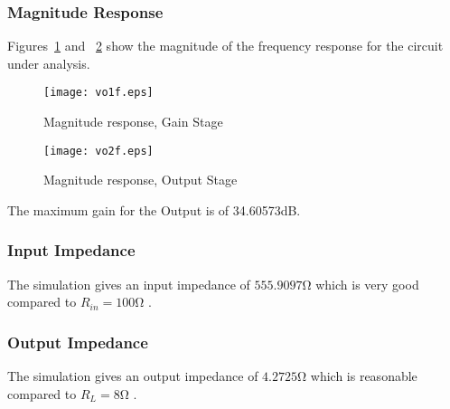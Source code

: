 \subsubsection{Magnitude Response}

Figures~\ref{fig:MRGS} and ~\ref{fig:MROS} show the magnitude of the frequency response for the
circuit under analysis.

\begin{figure}[h] \centering
\texttt{[image: vo1f.eps]}
\caption{Magnitude response, Gain Stage}
\label{fig:MRGS}
\end{figure}

\begin{figure}[h] \centering
\texttt{[image: vo2f.eps]}
\caption{Magnitude response, Output Stage}
\label{fig:MROS}
\end{figure}
\vspace{30mm}

The maximum gain for the Output is of 34.60573dB.

\subsubsection{Input Impedance}
The simulation gives an input impedance of $555.9097 \si{\ohm}$ which is very good compared to $R_{in}=100\si{\ohm}$ .

\subsubsection{Output Impedance}
The simulation gives an output impedance of $4.2725 \si{\ohm}$ which is reasonable compared to $R_{L}=8\si{\ohm}$ .
